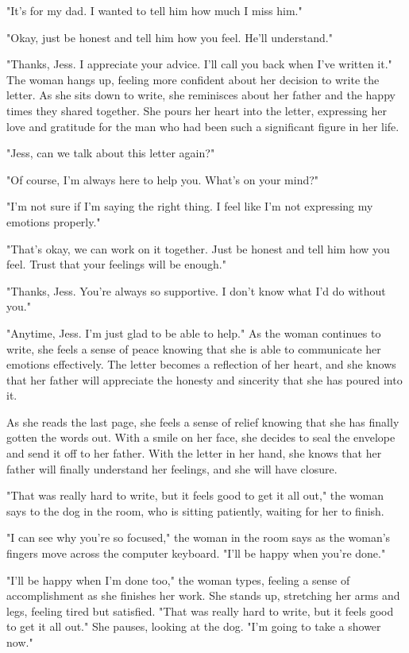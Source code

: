 \documentclass[smalldemyvopaper,11pt,twoside,onecolumn,openright,extrafontsizes]{memoir}
\begin{document}
"It's for my dad. I wanted to tell him how much I miss him."\par
"Okay, just be honest and tell him how you feel. He'll understand."\par
"Thanks, Jess. I appreciate your advice. I'll call you back when I've written it." The woman hangs up, feeling more confident about her decision to write the letter. As she sits down to write, she reminisces about her father and the happy times they shared together. She pours her heart into the letter, expressing her love and gratitude for the man who had been such a significant figure in her life.\par
"Jess, can we talk about this letter again?"\par
"Of course, I'm always here to help you. What's on your mind?"\par
"I'm not sure if I'm saying the right thing. I feel like I'm not expressing my emotions properly."\par
"That's okay, we can work on it together. Just be honest and tell him how you feel. Trust that your feelings will be enough."\par
"Thanks, Jess. You're always so supportive. I don't know what I'd do without you."\par
"Anytime, Jess. I'm just glad to be able to help." As the woman continues to write, she feels a sense of peace knowing that she is able to communicate her emotions effectively. The letter becomes a reflection of her heart, and she knows that her father will appreciate the honesty and sincerity that she has poured into it.\par
As she reads the last page, she feels a sense of relief knowing that she has finally gotten the words out. With a smile on her face, she decides to seal the envelope and send it off to her father. With the letter in her hand, she knows that her father will finally understand her feelings, and she will have closure.\par
"That was really hard to write, but it feels good to get it all out," the woman says to the dog in the room, who is sitting patiently, waiting for her to finish.\par
"I can see why you're so focused," the woman in the room says as the woman's fingers move across the computer keyboard. "I'll be happy when you're done."\par
"I'll be happy when I'm done too," the woman types, feeling a sense of accomplishment as she finishes her work. She stands up, stretching her arms and legs, feeling tired but satisfied. "That was really hard to write, but it feels good to get it all out." She pauses, looking at the dog. "I'm going to take a shower now."\par
\end{document}
